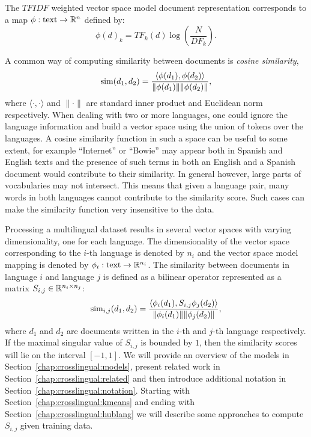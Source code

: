 The $TFIDF$ weighted vector space model document representation corresponds
to a map $\phi : \text{text} \rightarrow \mathbb{R}^n$ defined by:
$$\phi(d)_k = {TF}_k(d) \log\left( \frac{N}{{DF}_k}\right).$$

A common way of computing similarity between documents is \emph{cosine similarity},
$$\textnormal{sim}(d_1, d_2) = \frac{\langle \phi(d_1), \phi(d_2)\rangle}{\|\phi(d_1)\| \|\phi(d_2)\|},$$
where $\langle \cdot,\cdot \rangle$ and $\|\cdot\|$ are standard inner product and
Euclidean norm respectively. When dealing with two or more languages, one could ignore the language information
and build a vector space using the union of tokens over the languages. A cosine similarity
function in such a space can be useful to some extent, for example ``Internet'' or ``Bowie''
may appear both in Spanish and English texts and the presence of such terms in both an
English and a Spanish document would contribute to their similarity. In general however,
large parts of vocabularies may not intersect. This means that given a language pair,
many words in both languages cannot contribute to the similarity score. Such cases
can make the similarity function very insensitive to the data.

Processing a multilingual dataset results in several vector spaces with varying dimensionality,
one for each language. The dimensionality of the vector space corresponding to the $i$-th
language is denoted by $n_i$ and the vector space model mapping is denoted by
$\phi_i : \text{text} \rightarrow \mathbb{R}^{n_i}$.
The similarity between documents in language $i$ and language $j$ is defined as a bilinear
operator represented as a matrix $S_{i,j} \in \mathbb{R}^{n_i \times n_j}$:
$$\textnormal{sim}_{i,j}(d_1, d_2) = \frac{ \langle \phi_i (d_1), S_{i,j} \phi_j (d_2) \rangle }{\|\phi_i(d_1)\| \|\phi_j(d_2)\|},$$
where $d_1$ and $d_2$ are documents written in the $i$-th and $j$-th language respectively.
If the maximal singular value of $S_{i,j}$ is bounded by $1$, then the similarity scores
will lie on the interval $[-1, 1]$. We will provide an overview of the models in
Section~\ref{chap:crosslingual:models}, present related work in Section~\ref{chap:crosslingual:related}
and then introduce additional notation in Section~\ref{chap:crosslingual:notation}.
Starting with Section~\ref{chap:crosslingual:kmeans} and ending with Section~\ref{chap:crosslingual:hublang} we will
describe some approaches to compute $S_{i,j}$ given training data.

